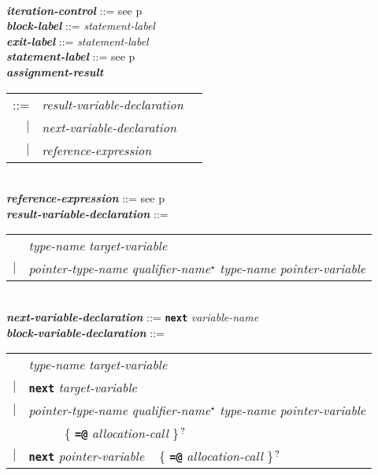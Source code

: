 \documentclass[12pt]{article}
\newcommand{\TT}[1]{{\tt \bfseries #1}}
\newcommand{\STAR}{{\Large $^\star$}}
\newcommand{\QMARK}{{$^{\,\mbox{\footnotesize ?}}$}}
\newcommand{\ttkey}[1]{{\tt \bfseries #1}}
\newcommand{\emkey}[1]{{\em \bfseries #1}}
\newcommand{\pagref}[1]{p\pageref{#1}}
\newenvironment{indpar}[1][0.3in]%
	{\begin{list}{}%
		     {\setlength{\itemsep}{0in}%
		      \setlength{\topsep}{0in}%
		      \setlength{\parsep}{1ex}%
		      \setlength{\labelwidth}{#1}%
		      \setlength{\leftmargin}{#1}%
		      \addtolength{\leftmargin}{\labelsep}}%
	 \item}%
	{\end{list}}
\begin{document}
\begin{indpar}
\\[0.5ex]
\emkey{iteration-control} ::= see \pagref{ITERATION-CONTROL}
\\[0.5ex]
\emkey{block-label}\label{BLOCK-LABEL} ::= {\em statement-label}
\\[0.5ex]
\emkey{exit-label} ::= {\em statement-label}
\\[0.5ex]
\emkey{statement-label} ::= see \pagref{STATEMENT-LABEL}
\\[0.5ex]
\emkey{assignment-result}\label{ASSIGNMENT-RESULT}
    \begin{tabular}[t]{@{}rll}
    ::= & {\em result-variable-declaration} \\
    $|$ & {\em next-variable-declaration} \\
    $|$ & {\em reference-expression}
    \end{tabular}
\\[0.5ex]
\emkey{reference-expression} ::= see \pagref{REFERENCE-EXPRESSIONS}
\\[0.5ex]
\emkey{result-variable-declaration}\label{RESULT-VARIABLE-DECLARATION} ::= \\
\hspace*{0.5in}\begin{tabular}{rl}
	    & {\em type-name} {\em target-variable} \\
	$|$ & {\em pointer-type-name} {\em qualifier-name}\STAR{}
	      {\em type-name} {\em pointer-variable}
	\end{tabular}
\\[0.5ex]
\emkey{next-variable-declaration}\label{NEXT-VARIABLE-DECLARATION}
    ::= \ttkey{next} {\em variable-name}
\\[0.5ex]
\emkey{block-variable-declaration}\label{BLOCK-VARIABLE-DECLARATION} ::= \\
\hspace*{0.5in}\begin{tabular}{rl}
	    & {\em type-name} {\em target-variable} \\
	$|$ & \TT{next} {\em target-variable} \\
	$|$ & {\em pointer-type-name} {\em qualifier-name}\STAR{}
	      {\em type-name} {\em pointer-variable} \\
	    & ~~~~~ \{ \TT{=@} {\em allocation-call} \}\QMARK{} \\
	$|$ & \TT{next} {\em pointer-variable}
	      ~ \{ \TT{=@} {\em allocation-call} \}\QMARK{} \\
	\end{tabular}
\\[0.5ex]

\end{indpar}
\end{document}
